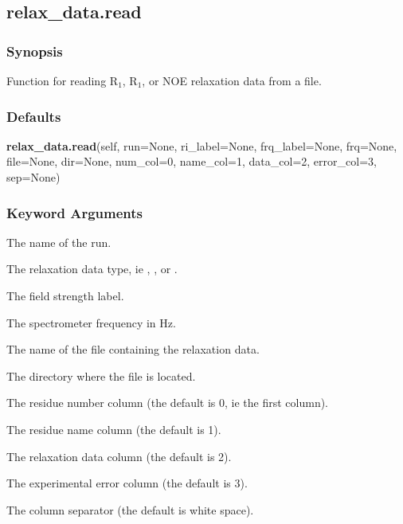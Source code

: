  \subsection{relax\_data.read} 

  
 \subsubsection{Synopsis} 

 Function for reading R$_1$, R$_1$, or NOE relaxation data from a file. 
  

  
 \subsubsection{Defaults} 

 \textsf{\textbf{relax\_data.read}(self, run=None, ri\_label=None, frq\_label=None, frq=None, file=None, dir=None, num\_col=0, name\_col=1, data\_col=2, error\_col=3, sep=None)} 

  
 \subsubsection{Keyword Arguments} 

   The name of the run.   

   The relaxation data type, ie , , or .   

   The field strength label.   

   The spectrometer frequency in Hz.   

   The name of the file containing the relaxation data.   

   The directory where the file is located.   

   The residue number column (the default is 0, ie the first column).   

   The residue name column (the default is 1).   

   The relaxation data column (the default is 2).   

   The experimental error column (the default is 3).   

   The column separator (the default is white space).  

